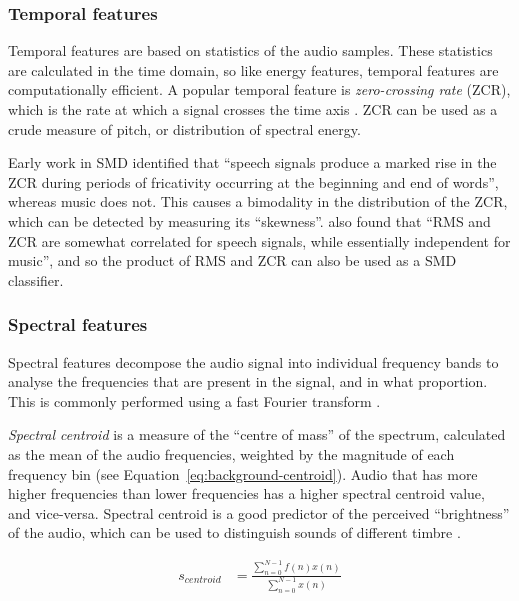 \subsubsection{Temporal features}\label{sec:background-temporal}

Temporal features are based on statistics of the audio samples. These statistics are calculated in the time domain, so
like energy features, temporal features are computationally efficient.  A popular temporal feature is
\textit{zero-crossing rate} (ZCR), which is the rate at which a signal crosses the time axis \citep[p. 37]{Zhang2001}.
ZCR can be used as a crude measure of pitch, or distribution of spectral energy.

Early work in SMD \citep{Saunders1996} identified that ``speech signals produce a marked rise in the ZCR during periods
of fricativity occurring at the beginning and end of words'', whereas music does not. This causes a bimodality in the
distribution of the ZCR, which can be detected by measuring its ``skewness''.
\citet{Panagiotakis2005} also found that ``RMS and ZCR are somewhat correlated for speech signals, while essentially
independent for music'', and so the product of RMS and ZCR can also be used as a SMD classifier.



\subsubsection{Spectral features}\label{sec:background-spectral}

Spectral features decompose the audio signal into individual frequency bands to analyse the frequencies that are present in the
signal, and in what proportion.  This is commonly performed using a fast Fourier transform \citep{Smith2007}.

\textit{Spectral centroid} \citep{Smaragdis2009} is a measure of the ``centre of mass'' of the spectrum, calculated as the mean of the audio
frequencies, weighted by the magnitude of each frequency bin (see Equation~\ref{eq:background-centroid}). Audio that
has more higher
frequencies than lower frequencies has a higher spectral centroid value, and vice-versa.  Spectral centroid is a good
predictor of the perceived ``brightness'' of the audio, which can be used to distinguish sounds of different timbre
\citep{Schubert2004}.

\begin{align}
  s_{centroid} &= \frac{
  \sum_{n=0}^{N-1}
    f(n)
    x(n)
} {
  \sum_{n=0}^{N-1}
    x(n)
  }\label{eq:background-centroid}
\end{align}


